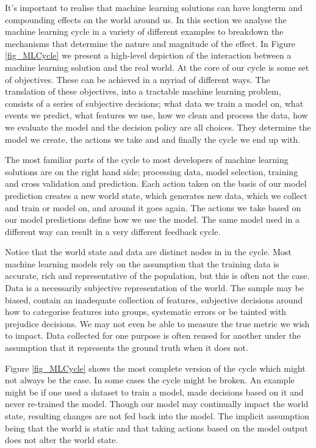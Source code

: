 It's important to realise that machine learning solutions can have longterm and compounding effects on the world around us. In this section we analyse the machine learning cycle in a variety of different examples to breakdown the mechanisms that determine the nature and magnitude of the effect. In Figure \ref{fig_MLCycle} we present a high-level depiction of the interaction between a machine learning solution and the real world. At the core of our cycle is some set of objectives. These can be achieved in a myriad of different ways. The translation of these objectives, into a tractable machine learning problem, consists of a series of subjective decisions; what data we train a model on, what events we predict, what features we use, how we clean and process the data, how we evaluate the model and the decision policy are all choices. They determine the model we create, the actions we take and and finally the cycle we end up with.

The most familiar parts of the cycle to most developers of machine learning solutions are on the right hand side; processing data, model selection, training and cross validation and prediction. Each action taken on the basis of our model prediction creates a new world state, which generates new data, which we collect and train or model on, and around it goes again. The actions we take based on our model predictions define how we use the model. The same model used in a different way can result in a very different feedback cycle.

Notice that the world state and data are distinct nodes in in the cycle. Most machine learning models rely on the assumption that the training data is accurate, rich and representative of the population, but this is often not the case. Data is a necessarily subjective representation of the world. The sample may be biased, contain an inadequate collection of features, subjective decisions around how to categorise features into groups, systematic errors or be tainted with prejudice decisions. We may not even be able to measure the true metric we wish to impact. Data collected for one purpose is often reused for another under the assumption that it represents the ground truth when it does not.

Figure \ref{fig_MLCycle} shows the most complete version of the cycle which might not always be the case. In some cases the cycle might be broken. An example might be if one used a dataset to train a model, made decisions based on it and never re-trained the model. Though our model may continually impact the world state, resulting changes are not fed back into the model. The implicit assumption being that the world is static and that taking actions based on the model output does not alter the world state.


